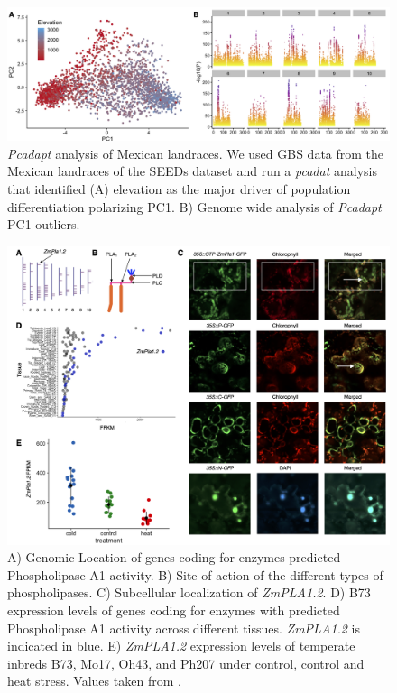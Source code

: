 \documentclass[9pt,twocolumn,twoside]{BioRxiv}
\begin{document}
\begin{figure}[t]
\begin{center}
\includegraphics[width=0.8\paperwidth]{Sup_Figures/Sup_Fig_2.png}
\caption{\textit{Pcadapt} analysis of Mexican landraces. We used GBS data from the Mexican landraces of the SEEDs dataset \citep{Romero_Navarro2017-cn} and run a \textit{pcadat} analysis \citep{Luu2017-ws} that identified (A) elevation as the major driver of population differentiation polarizing PC1.  
B) Genome wide analysis of \textit{Pcadapt} PC1 outliers. 
}
\label{SupFig2}
\end{center}
\end{figure} 

\begin{figure}[t]
\begin{center}
\includegraphics[width=0.8\paperwidth]{Sup_Figures/Sup_Fig_3.png}
\caption{A) Genomic Location of genes coding for enzymes predicted Phospholipase A1 activity. 
B) Site of action of the different types of phospholipases.
C) Subcellular localization of \textit{ZmPLA1.2}.
D) B73 expression levels of genes coding for enzymes with predicted Phospholipase A1 activity across different tissues. \textit{ZmPLA1.2} is indicated in blue. 
E) \textit{ZmPLA1.2} expression levels of temperate inbreds B73, Mo17, Oh43, and Ph207 under control, control and heat stress. Values taken from \cite{Waters2017-nat}. 
}
\label{SupFig4}
\end{center}
\end{figure}  
\end{document}
